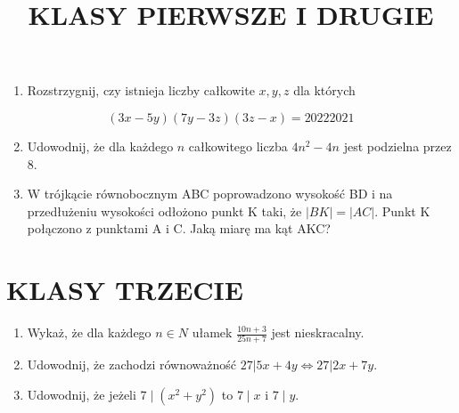 \documentclass[10pt]{article}
\title{KLASY PIERWSZE I DRUGIE }
\author{}
\date{}
\begin{document}
\maketitle
\begin{enumerate}
  \item Rozstrzygnij, czy istnieja liczby całkowite \(x, y, z\) dla których
\end{enumerate}

\[
(3 x-5 y)(7 y-3 z)(3 z-x)=20222021
\]

\begin{enumerate}
  \setcounter{enumi}{1}
  \item Udowodnij, że dla każdego \(n\) całkowitego liczba \(4 n^{2}-4 n\) jest podzielna przez 8.
  \item W trójkącie równobocznym ABC poprowadzono wysokość BD i na przedłużeniu wysokości odłożono punkt K taki, że \(|B K|=|A C|\). Punkt K połączono z punktami A i C. Jaką miarę ma kąt AKC?
\end{enumerate}

\section*{KLASY TRZECIE}
\begin{enumerate}
  \item Wykaż, że dla każdego \(n \in N\) ułamek \(\frac{10 n+3}{25 n+7}\) jest nieskracalny.
  \item Udowodnij, że zachodzi równoważność \(27|5 x+4 y \Leftrightarrow 27| 2 x+7 y\).
  \item Udowodnij, że jeżeli \(7 \mid\left(x^{2}+y^{2}\right)\) to \(7 \mid x\) i \(7 \mid y\).
\end{enumerate}
\end{document}
